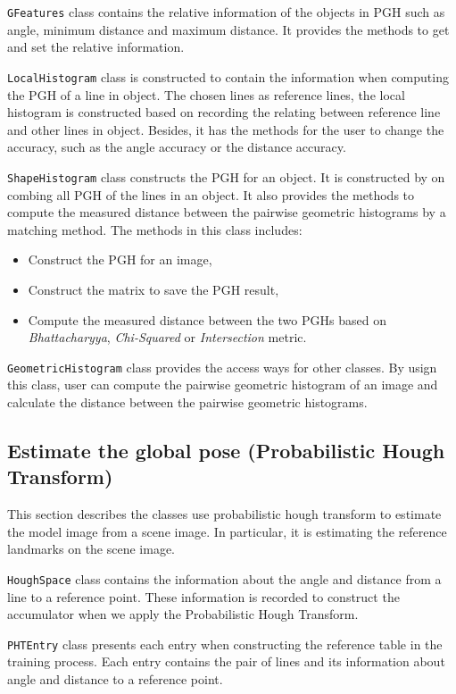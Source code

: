 \texttt{GFeatures} class contains the relative information of the objects in PGH such as angle, minimum distance and maximum distance. It provides the methods to get and set the relative information.

\texttt{LocalHistogram} class is constructed to contain the information when computing the PGH of a line in object. The chosen lines as reference lines, the local histogram is constructed based on recording the relating between reference line and other lines in object. Besides, it has the methods for the user to change the accuracy, such as the angle accuracy or the distance accuracy.

\texttt{ShapeHistogram} class constructs the PGH for an object. It is constructed by on combing all PGH of the lines in an object. It also provides the methods to compute the measured distance between the pairwise geometric histograms by a matching method. The methods in this class includes:
\begin{itemize}
\item Construct the PGH for an image,
\item Construct the matrix to save the PGH result,
\item Compute the measured distance between the two PGHs based on \textit{Bhattacharyya}, \textit{Chi-Squared} or \textit{Intersection} metric.
\end{itemize}

\texttt{GeometricHistogram} class provides the access ways for other classes. By usign this class, user can compute the pairwise geometric histogram of an image and calculate the distance between the pairwise geometric histograms.
\subsection{Estimate the global pose (Probabilistic Hough Transform)}
This section describes the classes use probabilistic hough transform to estimate the model image from a scene image. In particular, it is estimating the reference landmarks on the scene image.

\texttt{HoughSpace} class contains the information about the angle and distance from a line to a reference point. These information is recorded to construct the accumulator when we apply the Probabilistic Hough Transform.

\texttt{PHTEntry} class presents each entry when constructing the reference table in the training process. Each entry contains the pair of lines and its information about angle and distance to a reference point.


